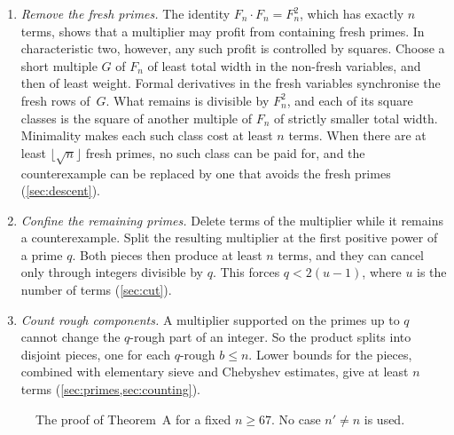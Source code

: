 \begin{enumerate}[label=\textup{(\roman*)}]
\item \emph{Remove the fresh primes.} The identity $F_n\cdot F_n=F_n^2$, which has exactly $n$ terms, shows that a multiplier may profit from containing fresh primes. In characteristic two, however, any such profit is controlled by squares. Choose a short multiple $G$ of $F_n$ of least total width in the non-fresh variables, and then of least weight. Formal derivatives in the fresh variables synchronise the fresh rows of~$G$. What remains is divisible by $F_n^2$, and each of its square classes is the square of another multiple of $F_n$ of strictly smaller total width. Minimality makes each such class cost at least $n$ terms. When there are at least $\lfloor\sqrt n\rfloor$ fresh primes, no such class can be paid for, and the counterexample can be replaced by one that avoids the fresh primes (\cref{sec:descent}).
\item \emph{Confine the remaining primes.} Delete terms of the multiplier while it remains a counterexample. Split the resulting multiplier at the first positive power of a prime $q$. Both pieces then produce at least $n$ terms, and they can cancel only through integers divisible by $q$. This forces $q<2(u-1)$, where $u$ is the number of terms (\cref{sec:cut}).
\item \emph{Count rough components.} A multiplier supported on the primes up to $q$ cannot change the $q$-rough part of an integer. So the product splits into disjoint pieces, one for each $q$-rough $b\le n$. Lower bounds for the pieces, combined with elementary sieve and Chebyshev estimates, give at least $n$ terms (\cref{sec:primes,sec:counting}).
\end{enumerate}

\begin{figure}[ht]
\centering
{}
\caption{The proof of Theorem~A for a fixed $n\ge67$. No case $n'\ne n$ is used.}\label{fig:flow}
\end{figure}

